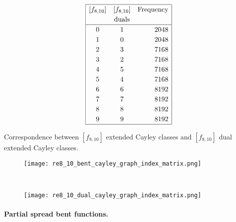 \documentclass[12pt,a4paper]{article}
\begin{document}
\begin{table}
\small{}
\begin{align*}
\def\arraystretch{1.2}
\begin{array}{|ccr|}
\hline
[f_{8,10}] &
[f_{8,10}] &
\text{Frequency}
\\
&
\text{duals} &
\\
\hline
  0 &    1 & 2048
\\
  1 &    0 & 2048
\\
  2 &    3 & 7168
\\
  3 &    2 & 7168
\\
  4 &    5 & 7168
\\
  5 &    4 & 7168
\\
  6 &    6 & 8192
\\
  7 &    7 & 8192
\\
  8 &    8 & 8192
\\
  9 &    9 & 8192
\\
\hline
\end{array}
\end{align*}
\caption{Correspondence between $[f_{8,10}]$ extended Cayley classes and $[f_{8,10}]$ dual extended Cayley classes.}
\label{tab-c8_10-dual-EC_classes}
\end{table}

\begin{figure}[!bhpt] %
\centering
\begin{minipage}{.48\textwidth}
  \centering
  \texttt{[image: re8\_10\_bent\_cayley\_graph\_index\_matrix.png]}
  \label{fig:c8_10_bent_cayley_graph_index_matrix}
\end{minipage}
~~
\begin{minipage}{.48\textwidth}
  \centering
  \texttt{[image: re8\_10\_dual\_cayley\_graph\_index\_matrix.png]}
  \label{fig:c8_10_dual_cayley_graph_index_matrix}
\end{minipage}%
\end{figure}

\paragraph*{Partial spread bent functions.}
\end{document}
